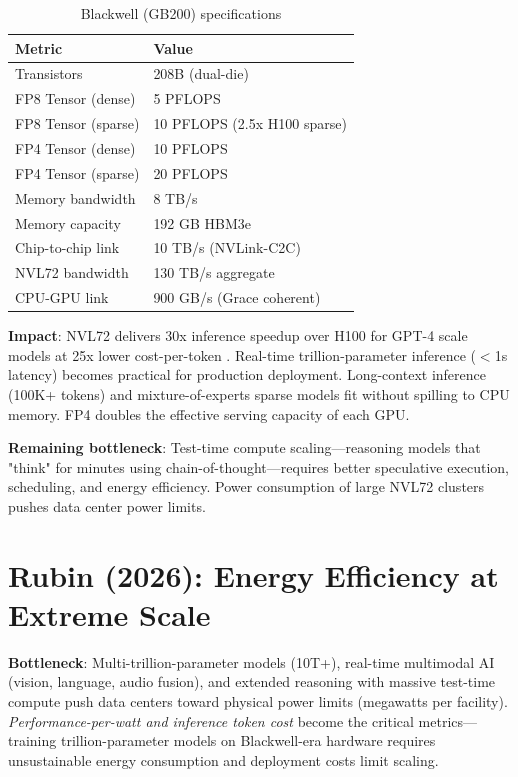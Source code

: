 \documentclass{article}
\begin{document}
\begin{table}[h]
\centering\small
\begin{tabular}{ll}
\toprule
Metric & Value \\
\midrule
Transistors & 208B (dual-die) \\
FP8 Tensor (dense) & 5 PFLOPS \\
FP8 Tensor (sparse) & 10 PFLOPS (2.5x H100 sparse) \\
FP4 Tensor (dense) & 10 PFLOPS \\
FP4 Tensor (sparse) & 20 PFLOPS \\
Memory bandwidth & 8 TB/s \\
Memory capacity & 192 GB HBM3e \\
Chip-to-chip link & 10 TB/s (NVLink-C2C) \\
NVL72 bandwidth & 130 TB/s aggregate \\
CPU-GPU link & 900 GB/s (Grace coherent) \\
\bottomrule
\end{tabular}
\caption{Blackwell (GB200) specifications}
\end{table}

\textbf{Impact}: NVL72 delivers 30x inference speedup over H100 for GPT-4 scale models at 25x lower cost-per-token \cite{nvidia2024blackwellperf}. Real-time trillion-parameter inference ($<$1s latency) becomes practical for production deployment. Long-context inference (100K+ tokens) and mixture-of-experts sparse models fit without spilling to CPU memory. FP4 doubles the effective serving capacity of each GPU.

\textbf{Remaining bottleneck}: Test-time compute scaling—reasoning models that "think" for minutes using chain-of-thought—requires better speculative execution, scheduling, and energy efficiency. Power consumption of large NVL72 clusters pushes data center power limits.

\section{Rubin (2026): Energy Efficiency at Extreme Scale}

\textbf{Bottleneck}: Multi-trillion-parameter models (10T+), real-time multimodal AI (vision, language, audio fusion), and extended reasoning with massive test-time compute push data centers toward physical power limits (megawatts per facility). \textit{Performance-per-watt and inference token cost} become the critical metrics—training trillion-parameter models on Blackwell-era hardware requires unsustainable energy consumption and deployment costs limit scaling.
\end{document}
